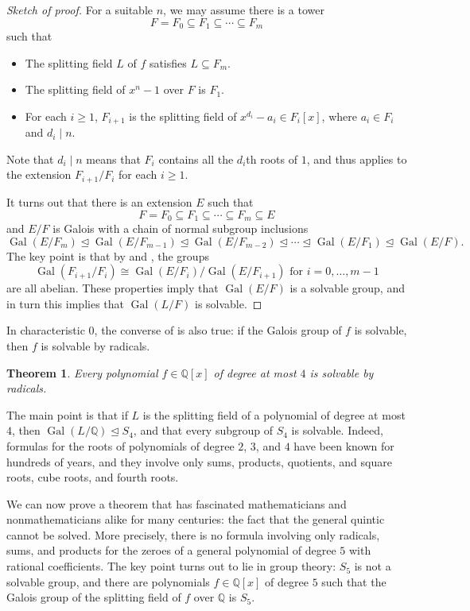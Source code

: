 \documentclass[12pt]{report}
\newtheorem{theorem}{Theorem}[chapter]
\numberwithin{equation}{section}
\numberwithin{theorem}{chapter}
\theoremstyle{definition}
\newtheorem*{basic properties}{Basic Properties}
\newtheorem*{Important Remark}{Important Remark}
\DeclareMathOperator{\Gal}{Gal}
\def\nsg{\unlhd}
\begin{document}
\begin{proof}[Sketch of proof]
For a suitable $n$, we may assume there is a tower
$$F = F_0 \subseteq F_1 \subseteq \cdots \subseteq F_m$$
such that 
\begin{itemize}
	\item The splitting field $L$ of $f$ satisfies $L \subseteq F_m$.
	\item The splitting field of $x^n -1$ over $F$ is $F_1$.
	\item For each $i \geqslant 1$, $F_{i+1}$ is the splitting field of $x^{d_i} - a_i \in F_i[x]$, where $a_i \in F_i$ and $d_i \mid n$.  
\end{itemize}

Note that $d_i \mid n$ means that $F_i$ contains all the $d_i$th roots of $1$, and thus  applies to the extension $F_{i+1}/F_i$ for each $i \geqslant 1$.

It turns out that there is an extension $E$ such that 
$$F = F_0 \subseteq F_1 \subseteq \cdots \subseteq F_m \subseteq E$$
and $E/F$ is Galois with a chain of normal subgroup inclusions
$$\Gal(E/F_m) \nsg \Gal(E/F_{m-1}) \nsg \Gal(E/F_{m-2}) \nsg \cdots \nsg\Gal(E/F_{1}) \nsg \Gal(E/F).$$
The key point is that by  and , the groups 
$$\Gal(F_{i+1}/F_i)\cong\Gal(E/F_i)/\Gal(E/F_{i+1}) \text{ for } i = 0, \dots, m-1$$ 
are all abelian. These properties imply that $\Gal(E/F)$ is a solvable group, and in turn this implies that $\Gal(L/F)$ is solvable.
\end{proof}

In characteristic $0$, the converse of  is also true: if the Galois group of $f$ is solvable, then $f$ is solvable by radicals. 

\begin{theorem}
	Every polynomial $f \in \mathbb{Q}[x]$ of degree at most $4$ is solvable by radicals.
\end{theorem}


The main point is that if $L$ is the splitting field of a polynomial of degree at most $4$, then $\Gal(L/\mathbb{Q}) \nsg S_4$, and that every subgroup of $S_4$ is solvable. Indeed, formulas for the roots of polynomials of degree $2$, $3$, and $4$ have been known for hundreds of years, and they involve only sums, products, quotients, and square roots, cube roots, and fourth roots.


We can now prove a theorem that has fascinated mathematicians and nonmathematicians alike for many centuries: the fact that the general quintic cannot be solved. More precisely, there is no formula involving  only radicals, sums, and products for the zeroes of a general polynomial of degree $5$ with rational coefficients. The key point turns out to lie in group theory: $S_5$ is not a solvable group, and there are polynomials $f \in \mathbb{Q}[x]$ of degree $5$ such that the Galois group of the splitting field of $f$ over $\mathbb{Q}$ is $S_5$.
\end{document}
